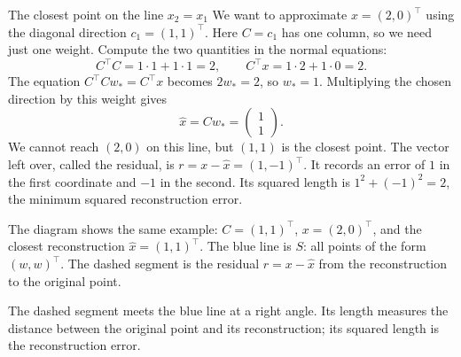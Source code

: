 \documentclass[a4paper,12pt,oneside]{report}
\begin{document}
\begin{framedexample}{The closest point on the line $x_2=x_1$}
We want to approximate $x=(2,0)^\top$ using the diagonal direction
$c_1=(1,1)^\top$. Here $C=c_1$ has one column, so we need just one
weight. Compute the two quantities in the normal equations:
\[
  C^\top C=1\cdot1+1\cdot1=2,\qquad
  C^\top x=1\cdot2+1\cdot0=2.
\]
The equation $C^\top Cw_*=C^\top x$ becomes $2w_*=2$, so $w_*=1$.
Multiplying the chosen direction by this weight gives
\[
  \hat{x}=Cw_*=\begin{pmatrix}1\\1\end{pmatrix}.
\]
We cannot reach $(2,0)$ on this line, but $(1,1)$ is the closest point.
The vector left over, called the residual, is
$r=x-\hat{x}=(1,-1)^\top$. It records an error of $1$ in the first
coordinate and $-1$ in the second. Its squared length is
$1^2+(-1)^2=2$, the minimum squared reconstruction error.
\end{framedexample}

The diagram shows the same example: $C=(1,1)^\top$, $x=(2,0)^\top$,
and the closest reconstruction $\hat{x}=(1,1)^\top$. The blue line is
$S$: all points of the form $(w,w)^\top$. The dashed segment is the
residual $r=x-\hat{x}$ from the reconstruction to the original point.

\begin{center}
\end{center}

The dashed segment meets the blue line at a right angle. Its length
measures the distance between the original point and its reconstruction;
its squared length is the reconstruction error.
\end{document}
